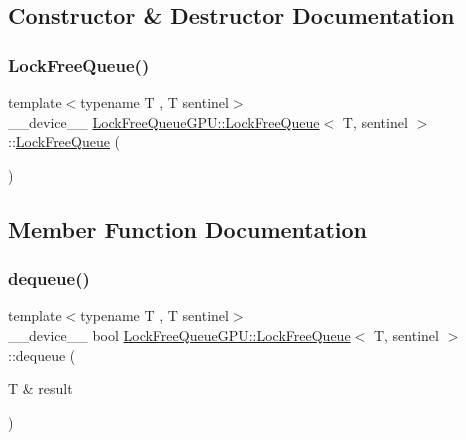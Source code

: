 \subsection{Constructor \& Destructor Documentation}
\mbox{\label{class_lock_free_queue_g_p_u_1_1_lock_free_queue_ae85d149d9b7b114eb5a00e2ec93cd4c4}} 
\subsubsection{\texorpdfstring{Lock\+Free\+Queue()}{LockFreeQueue()}}
{\footnotesize\ttfamily template$<$typename T , T sentinel$>$ \\
\+\_\+\+\_\+device\+\_\+\+\_\+ \mbox{\hyperlink{class_lock_free_queue_g_p_u_1_1_lock_free_queue}{Lock\+Free\+Queue\+G\+P\+U\+::\+Lock\+Free\+Queue}}$<$ T, sentinel $>$\+::\mbox{\hyperlink{class_lock_free_queue_g_p_u_1_1_lock_free_queue}{Lock\+Free\+Queue}} (\begin{DoxyParamCaption}{ }\end{DoxyParamCaption})\hspace{0.3cm}{\ttfamily [inline]}}



\subsection{Member Function Documentation}
\mbox{\label{class_lock_free_queue_g_p_u_1_1_lock_free_queue_a7d1f7625cfed705520e6a3a6171c6689}} 
\subsubsection{\texorpdfstring{dequeue()}{dequeue()}}
{\footnotesize\ttfamily template$<$typename T , T sentinel$>$ \\
\+\_\+\+\_\+device\+\_\+\+\_\+ bool \mbox{\hyperlink{class_lock_free_queue_g_p_u_1_1_lock_free_queue}{Lock\+Free\+Queue\+G\+P\+U\+::\+Lock\+Free\+Queue}}$<$ T, sentinel $>$\+::dequeue (\begin{DoxyParamCaption}\item[{T \&}]{result }\end{DoxyParamCaption})\hspace{0.3cm}{\ttfamily [inline]}}

